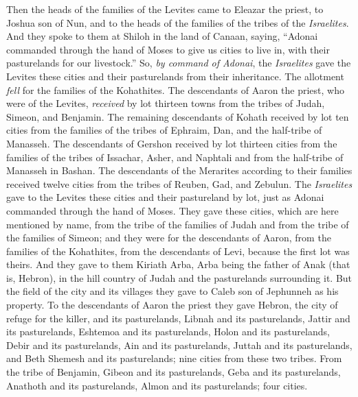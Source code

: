 \begin{biblechapter} %
 Then the heads of the families of the Levites came to Eleazar the priest, to Joshua son of Nun, and to the heads of the families of the tribes of the \textit{Israelites}.
\verse And they spoke to them at Shiloh in the land of Canaan, saying, “Adonai commanded through the hand of Moses to give us cities to live in, with their pasturelands for our livestock.”
\verse So, \textit{by command of Adonai}, the \textit{Israelites} gave the Levites these cities and their pasturelands from their inheritance.
\verse The allotment \textit{fell} for the families of the Kohathites. The descendants of Aaron the priest, who were of the Levites, \textit{received} by lot thirteen towns from the tribes of Judah, Simeon, and Benjamin.
\verse The remaining descendants of Kohath received by lot ten cities from the families of the tribes of Ephraim, Dan, and the half-tribe of Manasseh.
\verse The descendants of Gershon received by lot thirteen cities from the families of the tribes of Issachar, Asher, and Naphtali and from the half-tribe of Manasseh in Bashan.
\verse The descendants of the Merarites according to their families received twelve cities from the tribes of Reuben, Gad, and Zebulun.
\verse The \textit{Israelites} gave to the Levites these cities and their pastureland by lot, just as Adonai commanded through the hand of Moses.
\verse They gave these cities, which are here mentioned by name, from the tribe of the families of Judah and from the tribe of the families of Simeon;
\verse and they were for the descendants of Aaron, from the families of the Kohathites, from the descendants of Levi, because the first lot was theirs.
\verse And they gave to them Kiriath Arba, Arba being the father of Anak (that is, Hebron), in the hill country of Judah and the pasturelands surrounding it.
\verse But the field of the city and its villages they gave to Caleb son of Jephunneh as his property.
\verse To the descendants of Aaron the priest they gave Hebron, the city of refuge for the killer, and its pasturelands, Libnah and its pasturelands,
\verse Jattir and its pasturelands, Eshtemoa and its pasturelands,
\verse Holon and its pasturelands, Debir and its pasturelands,
\verse Ain and its pasturelands, Juttah and its pasturelands, and Beth Shemesh and its pasturelands; nine cities from these two tribes.
\verse From the tribe of Benjamin, Gibeon and its pasturelands, Geba and its pasturelands,
\verse Anathoth and its pasturelands, Almon and its pasturelands; four cities.

\end{biblechapter}
